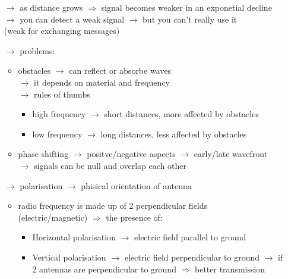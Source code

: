 \begin{itemize}
    \begin{itemize}
        \item[$\rightarrow$] as distance grows $\Rightarrow$ signal becomes
        weaker in an exponetial decline\\
        $\rightarrow$ you can detect a weak signal $\rightarrow$ but you can't
        really use it\\
        \hspace*{5cm}(weak for exchanging messages)
        \item[$\rightarrow$] problems:
        \begin{itemize}
            \item obstacles $\rightarrow$ can reflect or absorbe waves
            \\$\rightarrow$ it depends on material and frequency
            \\$\rightarrow$ rules of thumbs 
            \begin{itemize}
                \item high frequency $\rightarrow$ short distances, more affected
                by obstacles
                \item low frequency $\rightarrow$ long distances, less affected
                by obstacles
            \end{itemize}
            \item phase shifting $\rightarrow$ positve/negative aspects
            $\rightarrow$ early/late wavefront\\$\rightarrow$ signals can be null
            and overlap each other
        \end{itemize}
        \item[$\rightarrow$] polarisation $\rightarrow$ phisical orientation of
        antenna
        \begin{itemize}
            \item radio frequency is made up of 2 perpendicular fields\\
            (electric/magnetic)
            $\Rightarrow$ the presence of:
            \begin{itemize}
                \item Horizontal polarisation $\rightarrow$ electric field
                parallel to ground
                \item Vertical polarisation $\rightarrow$ electric field
                perpendicular to ground
                $\rightarrow$ if 2 antennas are perpendicular to ground
                $\Rightarrow$ better transmission
            \end{itemize}
        \end{itemize}
    \end{itemize}
\end{itemize}

